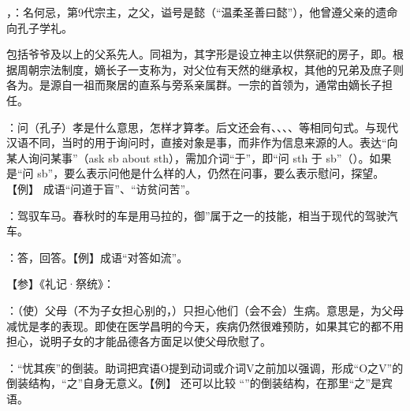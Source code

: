 {
\begin{lyitemize}
\item {}，：名何忌，第9代宗主，之父，谥号是懿（“温柔圣善曰懿”），他曾遵父亲的遗命向孔子学礼。%

包括爷爷及以上的父系先人。同祖为，其字形是设立神主以供祭祀的房子，即。根据周朝宗法制度，嫡长子一支称为，对父位有天然的继承权，其他的兄弟及庶子则各为。是源自一祖而聚居的直系与旁系亲属群。一宗的首领为，通常由嫡长子担任。

\item {}：问（孔子）孝是什么意思，怎样才算孝。后文还会有、、、、等相同句式。与现代汉语不同，当时的用于询问时，直接对象是事，而非作为信息来源的人。表达“向某人询问某事”（ask sb about sth），需加介词“于”，即“问 sth 于 sb”（）。如果是“问 sb”，要么表示问他是什么样的人，仍然在问事，要么表示慰问，探望。【例】    成语“问道于盲”、“访贫问苦”。
\item {}：驾驭车马。春秋时的车是用马拉的，御”属于之一的技能，相当于现代的驾驶汽车。
\item {}：答，回答。【例】成语“对答如流”。
\end{lyitemize}
【参】《礼记·祭统》：
}
{}


{
\item {}：（使）父母（不为子女担心别的，）只担心他们（会不会）生病。意思是，为父母减忧是孝的表现。即使在医学昌明的今天，疾病仍然很难预防，如果其它的都不用担心，说明子女的才能品德各方面足以使父母欣慰了。

：“忧其疾”的倒装。助词把宾语O提到动词或介词V之前加以强调，形成“O之V”的倒装结构，“之”自身无意义。【例】     还可以比较  “”的倒装结构，在那里“之”是宾语。
}
{}


